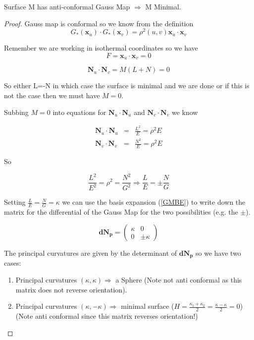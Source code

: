 \begin{prop}
Surface M has anti-conformal Gauss Map $\Rightarrow$ M Minimal.
\end{prop}

\begin{proof}
Gauss map is conformal so we know from the definition
\begin{displaymath}
G_*(\mathbf x_u) \cdot G_*(\mathbf x_v) = \rho^2(u,v)\mathbf x_u \cdot \mathbf x_v
\end{displaymath}

Remember we are working in isothermal coordinates so we have 
\begin{displaymath}F = \mathbf x_u \cdot \mathbf x_v = 0\end{displaymath}

\begin{displaymath}
\mathbf N_u \cdot \mathbf N_v = M(L+N) = 0
\end{displaymath}

So either L=-N in which case the surface is minimal and we are done or if this is not the case then we must have $M=0$.

Subbing $M=0$ into equations for $\mathbf N_u \cdot \mathbf N_u$ and $\mathbf N_v \cdot \mathbf N_v$ we know

\begin{eqnarray}
\nonumber
\mathbf N_u \cdot \mathbf N_u &=& \frac{L^2}{E} = \rho^2 E \\
\nonumber
\mathbf N_v \cdot \mathbf N_v &=& \frac{N^2}{E} = \rho^2 E
\end{eqnarray}

So

\begin{displaymath}
\frac{L^2}{E^2} = \rho^2 = \frac{N^2}{G^2} \Rightarrow \frac{L}{E} = \pm \frac{N}{G} 
\end{displaymath}

Setting $\frac{L}{E} = \frac{N}{G} = \kappa$ we can use the basis expansion (\ref{GMBE}) to write down the matrix for the differential of the Gauss Map for the two possibilities (e.g. the $\pm$).

\begin{displaymath}
\mathbf{dN_p} =
\left( \begin{array}{cc}
\kappa & 0 \\
0 & \pm \kappa
\end{array} \right)
\end{displaymath}

The principal curvatures are given by the determinant of $\mathbf{dN_p}$ so we have two cases:
\begin{enumerate} 
\item Principal curvatures $(\kappa, \kappa) \Rightarrow$ a Sphere (Note not anti conformal as this matrix does not reverse orientation).
\item Principal curvatures $(\kappa, -\kappa) \Rightarrow$ minimal surface ($H = \frac{\kappa_1 + \kappa_2}{2} = \frac{\kappa - \kappa}{2} = 0$) (Note anti conformal since this matrix reverses orientation!)
\end{enumerate}
\end{proof}

